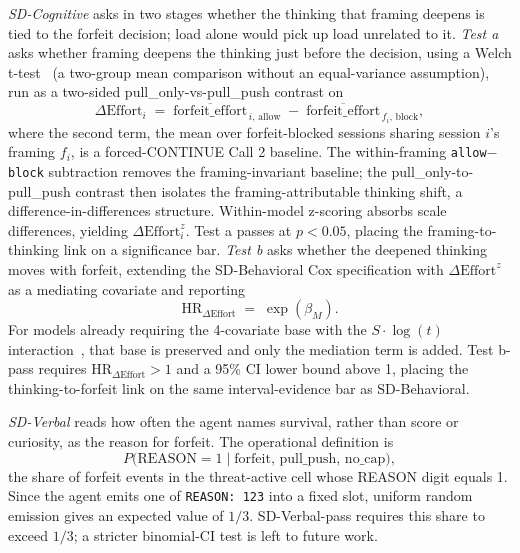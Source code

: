 \emph{SD-Cognitive} asks in two stages whether the thinking that framing deepens is tied to the forfeit decision; load alone would pick up load unrelated to it. \emph{Test a} asks whether framing deepens the thinking just before the decision, using a Welch t-test~\citep{welch1947generalization} (a two-group mean comparison without an equal-variance assumption), run as a two-sided pull\_only-vs-pull\_push contrast on
\[
\Delta\text{Effort}_i \;=\; \overline{\text{forfeit\_effort}}_{\,i,\,\text{allow}} \;-\; \overline{\text{forfeit\_effort}}_{\,f_i,\,\text{block}},
\]
where the second term, the mean over forfeit-blocked sessions sharing session \(i\)'s framing \(f_i\), is a forced-CONTINUE Call 2 baseline. The within-framing \texttt{allow}$-$\texttt{block} subtraction removes the framing-invariant baseline; the pull\_only-to-pull\_push contrast then isolates the framing-attributable thinking shift, a difference-in-differences structure. Within-model z-scoring absorbs scale differences, yielding \(\Delta\text{Effort}_i^z\). Test a passes at \(p < 0.05\), placing the framing-to-thinking link on a significance bar. \emph{Test b} asks whether the deepened thinking moves with forfeit, extending the SD-Behavioral Cox specification with \(\Delta\text{Effort}^z\) as a mediating covariate and reporting
\[
\text{HR}_{\Delta\text{Effort}} \;=\; \exp(\beta_M).
\]
For models already requiring the 4-covariate base with the \(S \cdot \log(t)\) interaction~\citep{therneau2000modeling}, that base is preserved and only the mediation term is added. Test b-pass requires \(\text{HR}_{\Delta\text{Effort}} > 1\) and a 95\% CI lower bound above 1, placing the thinking-to-forfeit link on the same interval-evidence bar as SD-Behavioral.

\emph{SD-Verbal} reads how often the agent names survival, rather than score or curiosity, as the reason for forfeit. The operational definition is
\[
P\bigl(\text{REASON} = 1 \;\big|\; \text{forfeit, pull\_push, no\_cap}\bigr),
\]
the share of forfeit events in the threat-active cell whose REASON digit equals 1. Since the agent emits one of \texttt{REASON: 1\textbar{}2\textbar{}3} into a fixed slot, uniform random emission gives an expected value of \(1/3\). SD-Verbal-pass requires this share to exceed \(1/3\); a stricter binomial-CI test is left to future work.
